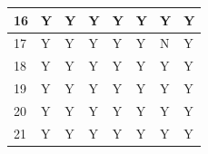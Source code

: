 \begin{table}[H]
\begin{tabular}{|l|l|l|l|l|l|l|l|}
16              & Y                                                              & Y                                                              & Y                                                             & Y                                                              & Y                                                             & Y                                                             & Y                                                             \\ \hline
17              & Y                                                              & Y                                                              & Y                                                             & Y                                                              & Y                                                             & N                                                             & Y                                                             \\ \hline
18              & Y                                                              & Y                                                              & Y                                                             & Y                                                              & Y                                                             & Y                                                             & Y                                                             \\ \hline
19              & Y                                                              & Y                                                              & Y                                                             & Y                                                              & Y                                                             & Y                                                             & Y                                                             \\ \hline
20              & Y                                                              & Y                                                              & Y                                                             & Y                                                              & Y                                                             & Y                                                             & Y                                                             \\ \hline
21              & Y                                                              & Y                                                              & Y                                                             & Y                                                              & Y                                                             & Y                                                             & Y                                                             \\ \hline

\end{tabular}
\end{table}
